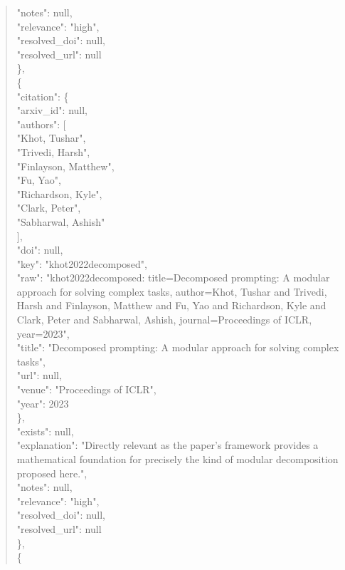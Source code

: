 \documentclass[11pt]{article}
\begin{document}
\begin{quote}
      "notes": null,\\
      "relevance": "high",\\
      "resolved\_doi": null,\\
      "resolved\_url": null\\
    \},\\
    \{\\
      "citation": \{\\
        "arxiv\_id": null,\\
        "authors": [\\
          "Khot, Tushar",\\
          "Trivedi, Harsh",\\
          "Finlayson, Matthew",\\
          "Fu, Yao",\\
          "Richardson, Kyle",\\
          "Clark, Peter",\\
          "Sabharwal, Ashish"\\
        ],\\
        "doi": null,\\
        "key": "khot2022decomposed",\\
        "raw": "khot2022decomposed: title=Decomposed prompting: A modular approach for solving complex tasks, author=Khot, Tushar and Trivedi, Harsh and Finlayson, Matthew and Fu, Yao and Richardson, Kyle and Clark, Peter and Sabharwal, Ashish, journal=Proceedings of ICLR, year=2023",\\
        "title": "Decomposed prompting: A modular approach for solving complex tasks",\\
        "url": null,\\
        "venue": "Proceedings of ICLR",\\
        "year": 2023\\
      \},\\
      "exists": null,\\
      "explanation": "Directly relevant as the paper's framework provides a mathematical foundation for precisely the kind of modular decomposition proposed here.",\\
      "notes": null,\\
      "relevance": "high",\\
      "resolved\_doi": null,\\
      "resolved\_url": null\\
    \},\\
    \{\\

\end{quote}
\end{document}
